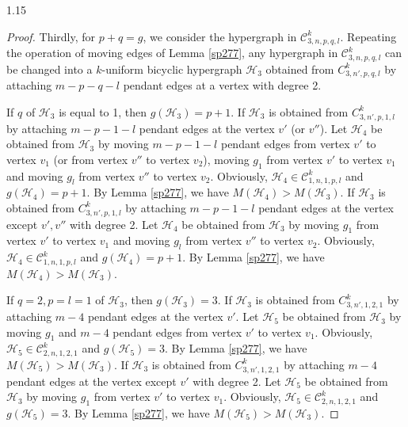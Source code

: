 \documentclass[preprint,12pt]{elsarticle1}
\numberwithin{equation}{section}
\begin{document}
\begin{spacing}{1.15}
\begin{proof}
Thirdly, for $p+q=g$, we consider the hypergraph in $\mathcal{C}_{3,n,p,q,l}^{k}$. Repeating the operation of moving edges of Lemma \ref{sp277}, any hypergraph in $\mathcal{C}_{3,n,p,q,l}^{k}$ can be changed into a $k$-uniform bicyclic hypergraph $\mathcal{H}_{3}$
obtained from $C_{3,n',p,q,l}^{k}$ by attaching $m-p-q-l$ pendant edges at a vertex with degree 2.


If $q$ of $\mathcal{H}_{3}$ is equal to 1, then $g(\mathcal{H}_{3})=p+1$.
If $\mathcal{H}_{3}$ is obtained from $C_{3,n',p,1,l}^{k}$ by attaching $m-p-1-l$ pendant edges at the vertex $v'$ (or $v''$). Let $\mathcal{H}_{4}$ be obtained from $\mathcal{H}_{3}$ by moving $m-p-1-l$ pendant edges from vertex $v'$ to vertex $v_{1}$ (or from vertex $v''$ to vertex $v_{2}$), moving $g_{1}$
from vertex $v'$ to vertex $v_{1}$ and moving $g_{l}$
from vertex $v''$ to vertex $v_{2}$. Obviously, $\mathcal{H}_{4}\in \mathcal{C}_{1,n,1,p,l}^{k}$ and $g(\mathcal{H}_{4})=p+1$.
By Lemma \ref{sp277}, we have $M(\mathcal{H}_{4})>M(\mathcal{H}_{3})$.
If $\mathcal{H}_{3}$ is obtained from $C_{3,n',p,1,l}^{k}$ by attaching $m-p-1-l$ pendant edges at the vertex except $v',v''$ with degree 2.  Let $\mathcal{H}_{4}$ be obtained from $\mathcal{H}_{3}$ by moving $g_{1}$ from vertex $v'$ to vertex $v_{1}$ and moving $g_{l}$
from vertex $v''$ to vertex $v_{2}$. Obviously, $\mathcal{H}_{4}\in \mathcal{C}_{1,n,1,p,l}^{k}$ and $g(\mathcal{H}_{4})=p+1$. By Lemma \ref{sp277}, we have $M(\mathcal{H}_{4})>M(\mathcal{H}_{3})$.


If $q=2, p=l=1$ of $\mathcal{H}_{3}$, then $g(\mathcal{H}_{3})=3$.
If $\mathcal{H}_{3}$ is obtained from $C_{3,n',1,2,1}^{k}$ by attaching $m-4$ pendant edges at the vertex $v'$. Let $\mathcal{H}_{5}$ be obtained from $\mathcal{H}_{3}$ by moving $g_{1}$ and $m-4$ pendant edges from vertex $v'$ to vertex $v_{1}$. Obviously, $\mathcal{H}_{5}\in \mathcal{C}_{2,n,1,2,1}^{k}$ and $g(\mathcal{H}_{5})=3$. By Lemma \ref{sp277}, we have $M(\mathcal{H}_{5})>M(\mathcal{H}_{3})$.
If $\mathcal{H}_{3}$ is obtained from $C_{3,n',1,2,1}^{k}$ by attaching $m-4$ pendant edges at the vertex except $v'$ with degree 2.  Let $\mathcal{H}_{5}$ be obtained from $\mathcal{H}_{3}$ by moving $g_{1}$
from vertex $v'$ to vertex $v_{1}$. Obviously, $\mathcal{H}_{5}\in \mathcal{C}_{2,n,1,2,1}^{k}$ and $g(\mathcal{H}_{5})=3$. By Lemma \ref{sp277}, we have $M(\mathcal{H}_{5})>M(\mathcal{H}_{3})$.



\end{proof}
\end{spacing}
\end{document}
